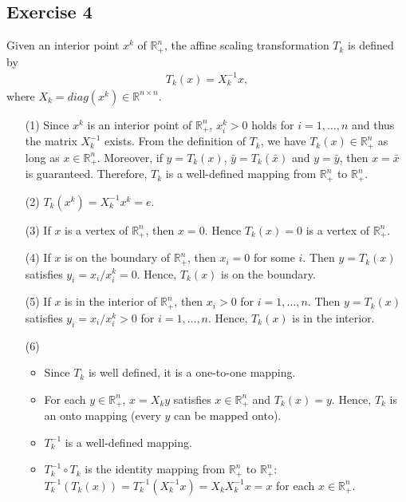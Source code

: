 \documentclass[11pt]{article}
\begin{document}
\subsection*{Exercise 4}
Given an interior point $x^k$ of $\mathbb{R}^n_+$, the affine scaling transformation $T_k$ is defined by 
\begin{align*}
T_k(x)=X^{-1}_kx,
\end{align*}
where $X_k=diag(x^k)\in\mathbb{R}^{n\times n}$.
\begin{itemize}
	\item[(1)] Since $x^k$ is an interior point of $\mathbb{R}^n_+$, $x^k_i>0$ holds for $i=1,\ldots,n$ and thus the matrix $X^{-1}_k$ exists. From the definition of $T_k$, we have $T_k(x)\in \mathbb{R}^n_+$ as long as $x\in\mathbb{R}^n_+$. Moreover, if $y=T_k(x)$, $\bar{y}=T_k(\bar{x})$ and $y=\bar{y}$, then $x=\bar{x}$ is guaranteed. Therefore, $T_k$ is a well-defined mapping from $\mathbb{R}^n_+$ to $\mathbb{R}^n_+$.
	
	\item[(2)] $T_k(x^k)=X^{-1}_kx^k=e$.
	\item[(3)] If $x$ is a vertex of $\mathbb{R}^n_+$, then $x=0$. Hence $T_k(x)=0$ is a vertex of $\mathbb{R}^n_+$.
	\item[(4)] If $x$ is on the boundary of $\mathbb{R}^n_+$, then $x_i=0$ for some $i$. Then $y=T_k(x)$ satisfies $y_i=x_i/x^k_i=0$. Hence, $T_k(x)$ is on the boundary.
	\item[(5)] If $x$ is in the interior of $\mathbb{R}^n_+$, then $x_i>0$ for $i=1,\ldots,n$. Then $y=T_k(x)$ satisfies $y_i=x_i/x^k_i>0$ for $i=1,\ldots,n$. Hence, $T_k(x)$ is in the interior.
	\item[(6)] \begin{itemize}
		\item Since $T_k$ is well defined, it is a one-to-one mapping.
		\item For each $y\in\mathbb{R}^n_+$, $x=X_ky$ satisfies $x\in\mathbb{R}^n_+$ and $T_k(x)=y$. Hence, $T_k$ is an onto mapping (every $y$ can be mapped onto).
		\item $T^{-1}_k$ is a well-defined mapping. 
		\item $T^{-1}_k\circ T_k$ is the identity mapping from $\mathbb{R}^n_+$ to $\mathbb{R}^n_+$: $T^{-1}_k(T_k(x))=T^{-1}_k(X^{-1}_kx)=X_kX^{-1}_kx=x$ for each $x\in\mathbb{R}^n_+$. 
	\end{itemize} 
\end{itemize}
\end{document}
